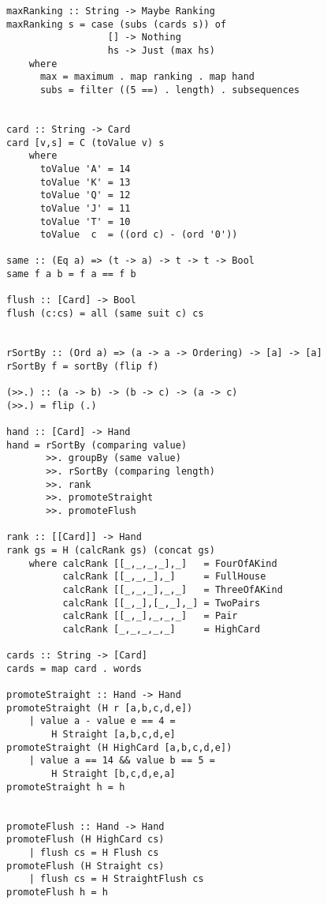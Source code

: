 \begin{lstlisting}[frame=single]
maxRanking :: String -> Maybe Ranking
maxRanking s = case (subs (cards s)) of
                  [] -> Nothing
                  hs -> Just (max hs)
    where 
      max = maximum . map ranking . map hand
      subs = filter ((5 ==) . length) . subsequences 


card :: String -> Card
card [v,s] = C (toValue v) s
    where 
      toValue 'A' = 14
      toValue 'K' = 13
      toValue 'Q' = 12
      toValue 'J' = 11
      toValue 'T' = 10
      toValue  c  = ((ord c) - (ord '0'))

same :: (Eq a) => (t -> a) -> t -> t -> Bool
same f a b = f a == f b

flush :: [Card] -> Bool
flush (c:cs) = all (same suit c) cs


rSortBy :: (Ord a) => (a -> a -> Ordering) -> [a] -> [a]
rSortBy f = sortBy (flip f)

(>>.) :: (a -> b) -> (b -> c) -> (a -> c)
(>>.) = flip (.)

hand :: [Card] -> Hand
hand = rSortBy (comparing value)
       >>. groupBy (same value)
       >>. rSortBy (comparing length)
       >>. rank
       >>. promoteStraight
       >>. promoteFlush    

rank :: [[Card]] -> Hand
rank gs = H (calcRank gs) (concat gs)  
    where calcRank [[_,_,_,_],_]   = FourOfAKind 
          calcRank [[_,_,_],_]     = FullHouse
          calcRank [[_,_,_],_,_]   = ThreeOfAKind
          calcRank [[_,_],[_,_],_] = TwoPairs
          calcRank [[_,_],_,_,_]   = Pair    
          calcRank [_,_,_,_,_]     = HighCard 

cards :: String -> [Card]
cards = map card . words 

promoteStraight :: Hand -> Hand
promoteStraight (H r [a,b,c,d,e]) 
    | value a - value e == 4 = 
        H Straight [a,b,c,d,e]
promoteStraight (H HighCard [a,b,c,d,e]) 
    | value a == 14 && value b == 5 = 
        H Straight [b,c,d,e,a]
promoteStraight h = h


promoteFlush :: Hand -> Hand
promoteFlush (H HighCard cs) 
    | flush cs = H Flush cs
promoteFlush (H Straight cs) 
    | flush cs = H StraightFlush cs
promoteFlush h = h
\end{lstlisting}
\lhend

